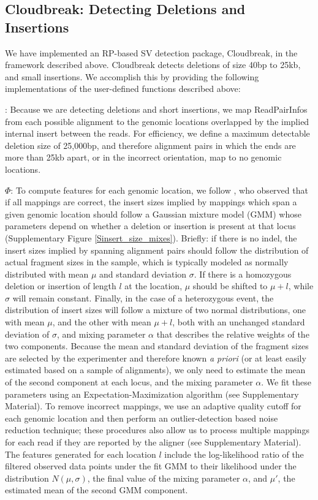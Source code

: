 \documentclass{bioinfo}
\begin{document}
\begin{methods}
\subsection{Cloudbreak: Detecting Deletions and Insertions}

We have implemented an RP-based SV detection package, Cloudbreak, in the framework described above. Cloudbreak detects deletions of size 40bp to 25kb, and small insertions. We accomplish this by providing the following implementations of the user-defined functions described above:

\textbf{}: Because we are detecting deletions and short insertions, we map ReadPairInfos from each possible alignment to the genomic locations overlapped by the implied internal insert between the reads. For efficiency, we define a maximum detectable deletion size of 25,000bp, and therefore alignment pairs in which the ends are more than 25kb apart, or in the incorrect orientation, map to no genomic locations.

\textbf{$\Phi$}: To compute features for each genomic location, we follow \cite{Lee:2009da}, who observed that if all mappings are correct, the insert sizes implied by mappings which span a given genomic location should follow a Gaussian mixture model (GMM) whose parameters depend on whether a deletion or insertion is present at that locus (Supplementary Figure \ref{Sinsert_size_mixes}). Briefly: if there is no indel, the insert sizes implied by spanning alignment pairs should follow the distribution of actual fragment sizes in the sample, which is typically modeled as normally distributed with mean $\mu$ and standard deviation $\sigma$. If there is a homozygous deletion or insertion of length $l$ at the location, $\mu$ should be shifted to $\mu + l$, while $\sigma$ will remain constant. Finally, in the case of a heterozygous event, the distribution of insert sizes will follow a mixture of two normal distributions, one with mean $\mu$, and the other with mean $\mu + l$, both with an unchanged standard deviation of $\sigma$, and mixing parameter $\alpha$ that describes the relative weights of the two components. Because the mean and standard deviation of the fragment sizes are selected by the experimenter and therefore known \emph{a priori} (or at least easily estimated based on a sample of alignments), we only need to estimate the mean of the second component at each locus, and the mixing parameter $\alpha$. We fit these parameters using an Expectation-Maximization algorithm (see Supplementary Material). To remove incorrect mappings, we use an adaptive quality cutoff for each genomic location and then perform an outlier-detection based noise reduction technique; these procedures also allow us to process multiple mappings for each read if they are reported by the aligner (see Supplementary Material). The features generated for each location $l$ include the log-likelihood ratio of the filtered observed data points under the fit GMM to their likelihood under the distribution $N(\mu,\sigma)$, the final value of the mixing parameter $\alpha$, and $\mu'$, the estimated mean of the second GMM component.


\end{methods}
\end{document}
